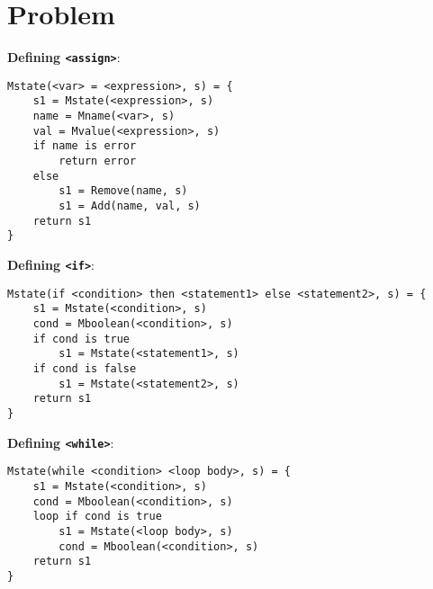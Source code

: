 \documentclass[letterpaper]{article}
\newcommand{\problem}{\section{Problem}}
\begin{document}
\problem{}
\textbf{Defining \texttt{<assign>}}:
\begin{verbatim}
Mstate(<var> = <expression>, s) = {
    s1 = Mstate(<expression>, s)
    name = Mname(<var>, s)
    val = Mvalue(<expression>, s)
    if name is error
        return error
    else
        s1 = Remove(name, s)
        s1 = Add(name, val, s)
    return s1
}
\end{verbatim}
\textbf{Defining \texttt{<if>}}:
\begin{verbatim}
Mstate(if <condition> then <statement1> else <statement2>, s) = {
    s1 = Mstate(<condition>, s)
    cond = Mboolean(<condition>, s)
    if cond is true
        s1 = Mstate(<statement1>, s)
    if cond is false
        s1 = Mstate(<statement2>, s)
    return s1
}
\end{verbatim}
\textbf{Defining \texttt{<while>}}:
\begin{verbatim}
Mstate(while <condition> <loop body>, s) = {
    s1 = Mstate(<condition>, s)
    cond = Mboolean(<condition>, s)
    loop if cond is true
        s1 = Mstate(<loop body>, s)
        cond = Mboolean(<condition>, s)
    return s1
}
\end{verbatim}
\end{document}
